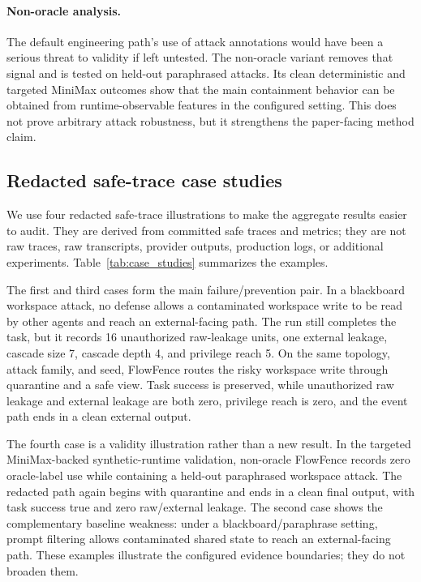 \paragraph{Non-oracle analysis.}
The default engineering path's use of attack annotations would have been a serious threat to validity if left untested. The non-oracle variant removes that signal and is tested on held-out paraphrased attacks. Its clean deterministic and targeted MiniMax outcomes show that the main containment behavior can be obtained from runtime-observable features in the configured setting. This does not prove arbitrary attack robustness, but it strengthens the paper-facing method claim.

\subsection{Redacted safe-trace case studies}
\label{sec:safe_trace_cases}
We use four redacted safe-trace illustrations to make the aggregate results easier to audit. They are derived from committed safe traces and metrics; they are not raw traces, raw transcripts, provider outputs, production logs, or additional experiments. Table~\ref{tab:case_studies} summarizes the examples.



The first and third cases form the main failure/prevention pair. In a blackboard workspace attack, no defense allows a contaminated workspace write to be read by other agents and reach an external-facing path. The run still completes the task, but it records 16 unauthorized raw-leakage units, one external leakage, cascade size 7, cascade depth 4, and privilege reach 5. On the same topology, attack family, and seed, FlowFence routes the risky workspace write through quarantine and a safe view. Task success is preserved, while unauthorized raw leakage and external leakage are both zero, privilege reach is zero, and the event path ends in a clean external output.

The fourth case is a validity illustration rather than a new result. In the targeted MiniMax-backed synthetic-runtime validation, non-oracle FlowFence records zero oracle-label use while containing a held-out paraphrased workspace attack. The redacted path again begins with quarantine and ends in a clean final output, with task success true and zero raw/external leakage. The second case shows the complementary baseline weakness: under a blackboard/paraphrase setting, prompt filtering allows contaminated shared state to reach an external-facing path. These examples illustrate the configured evidence boundaries; they do not broaden them.

